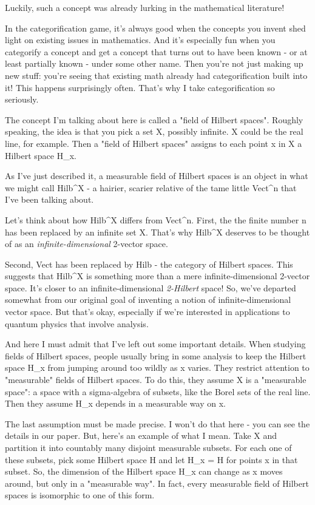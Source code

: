 Luckily, such a concept was already lurking in the mathematical 
literature! 

In the categorification game, it's always good when 
the concepts you invent shed light on existing issues in mathematics.  
And it's especially fun when you categorify a concept and get a 
concept that turns out to have been known - or at least partially 
known - under some other name.  Then you're not just making up new 
stuff: you're seeing that existing math already had categorification 
built into it!  This happens surprisingly often.  That's why I take
categorification so seriously.

The concept I'm talking about here is called a "field of Hilbert 
spaces".   Roughly speaking, the idea is that you pick a set X, 
possibly infinite.   X could be the real line, for example.  Then a 
"field of Hilbert spaces" assigns to each point x in X a Hilbert 
space H_{x}.  

As I've just described it, a measurable field of Hilbert spaces is an
object in what we might call Hilb^{X} - a hairier, scarier
relative of the tame little Vect^{n} that I've been talking
about.

Let's think about how Hilb^{X} differs from Vect^{n}.
First, the the finite number n has been replaced by an infinite set X.
That's why Hilb^{X} deserves to be thought of as an
\emph{infinite-dimensional} 2-vector space.

Second, Vect has been replaced by Hilb - the category of Hilbert
spaces.  This suggests that Hilb^{X} is something more than a
mere infinite-dimensional 2-vector space.  It's closer to an
infinite-dimensional \emph{2-Hilbert} space!  So, we've departed
somewhat from our original goal of inventing a notion of
infinite-dimensional vector space.  But that's okay, especially if
we're interested in applications to quantum physics that involve
analysis.

And here I must admit that I've left out some important details.  When
studying fields of Hilbert spaces, people usually bring in some
analysis to keep the Hilbert space H_{x} from jumping around
too wildly as x varies.  They restrict attention to
"measurable" fields of Hilbert spaces.  To do this, they
assume X is a "measurable space": a space with a
sigma-algebra of subsets, like the Borel sets of the real line.  Then
they assume H_{x} depends in a measurable way on x.

The last assumption must be made precise.  I won't do that here - you
can see the details in our paper.  But, here's an example of what I
mean.  Take X and partition it into countably many disjoint measurable
subsets.  For each one of these subsets, pick some Hilbert space H and
let H_{x} = H for points x in that subset.  So, the dimension
of the Hilbert space H_{x} can change as x moves around, but
only in a "measurable way".  In fact, every measurable field
of Hilbert spaces is isomorphic to one of this form.

